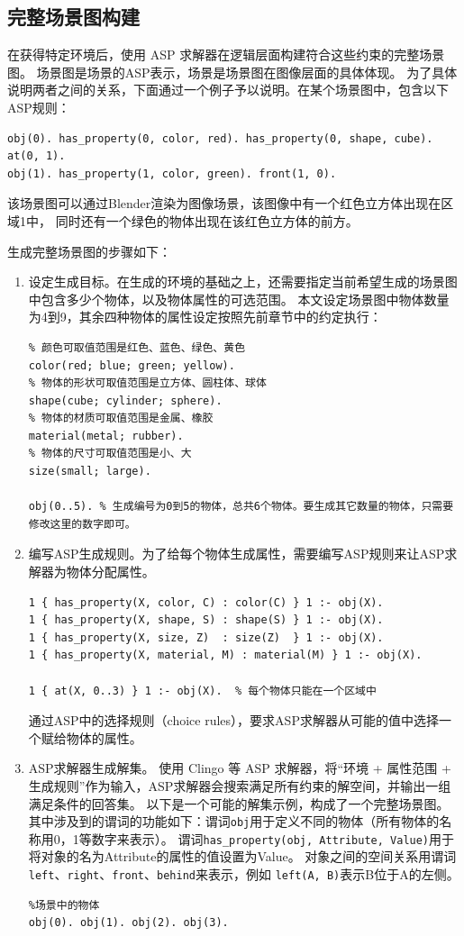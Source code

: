 \subsection{完整场景图构建}
在获得特定环境后，使用 ASP 求解器在逻辑层面构建符合这些约束的完整场景图。
场景图是场景的ASP表示，场景是场景图在图像层面的具体体现。
为了具体说明两者之间的关系，下面通过一个例子予以说明。在某个场景图中，包含以下ASP规则：
\begin{lstlisting}
obj(0). has_property(0, color, red). has_property(0, shape, cube). at(0, 1).
obj(1). has_property(1, color, green). front(1, 0).
\end{lstlisting}
该场景图可以通过Blender渲染为图像场景，该图像中有一个红色立方体出现在区域1中，
同时还有一个绿色的物体出现在该红色立方体的前方。

生成完整场景图的步骤如下：
\begin{enumerate}[itemsep=0pt,parsep=0pt]
\item 设定生成目标。在生成的环境的基础之上，还需要指定当前希望生成的场景图中包含多少个物体，以及物体属性的可选范围。
本文设定场景图中物体数量为4到9，其余四种物体的属性设定按照先前章节中的约定执行：
\begin{lstlisting}
% 颜色可取值范围是红色、蓝色、绿色、黄色
color(red; blue; green; yellow).
% 物体的形状可取值范围是立方体、圆柱体、球体
shape(cube; cylinder; sphere).
% 物体的材质可取值范围是金属、橡胶
material(metal; rubber).
% 物体的尺寸可取值范围是小、大
size(small; large).

obj(0..5). % 生成编号为0到5的物体，总共6个物体。要生成其它数量的物体，只需要修改这里的数字即可。
\end{lstlisting}
\item 编写ASP生成规则。为了给每个物体生成属性，需要编写ASP规则来让ASP求解器为物体分配属性。
\begin{lstlisting}
1 { has_property(X, color, C) : color(C) } 1 :- obj(X).
1 { has_property(X, shape, S) : shape(S) } 1 :- obj(X).
1 { has_property(X, size, Z)  : size(Z)  } 1 :- obj(X).
1 { has_property(X, material, M) : material(M) } 1 :- obj(X).

1 { at(X, 0..3) } 1 :- obj(X).  % 每个物体只能在一个区域中
\end{lstlisting}
通过ASP中的选择规则（choice rules），要求ASP求解器从可能的值中选择一个赋给物体的属性。
\item ASP求解器生成解集。
使用 Clingo 等 ASP 求解器，将“环境 + 属性范围 + 生成规则”作为输入，ASP求解器会搜索满足所有约束的解空间，并输出一组满足条件的回答集。
以下是一个可能的解集示例，构成了一个完整场景图。其中涉及到的谓词的功能如下：谓词\texttt{obj}用于定义不同的物体（所有物体的名称用0，1等数字来表示）。
谓词\texttt{has\_property(obj, Attribute, Value)}用于将对象的名为Attribute的属性的值设置为Value。
对象之间的空间关系用谓词\texttt{left}、\texttt{right}、\texttt{front}、\texttt{behind}来表示，例如
\texttt{left(A, B)}表示B位于A的左侧。
\begin{lstlisting}
%场景中的物体
obj(0). obj(1). obj(2). obj(3).


\end{lstlisting}
\end{enumerate}
